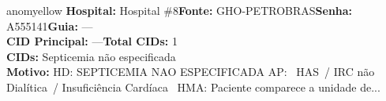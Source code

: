 \documentclass[a4paper,10pt]{article}
\begin{document}
\begin{anomalycard}[Interna\c{c}\~{a}o \#167195 | Pac. \#61189 | MODERADO (z=2.30) | LOS: 24d | 27/02/2026\,$\to$\,—]{anomyellow}
\textbf{Hospital:} Hospital \#8\quad \textbf{Fonte:} GHO-PETROBRAS\quad \textbf{Senha:} A555141\quad \textbf{Guia:} ---\\

\textbf{CID Principal:} {\small ---}\quad\textbf{Total CIDs:} 1\\

\textbf{CIDs:} {\scriptsize Septicemia não especificada}\\

\textbf{Motivo:} {\scriptsize HD: SEPTICEMIA NAO ESPECIFICADA  AP:  HAS / IRC não Dialítica / Insuficiência Cardíaca    HMA: Paciente comparece a unidade de...}\\



\end{anomalycard}
\end{document}
